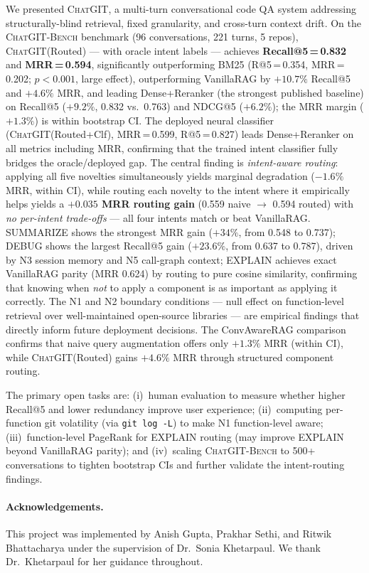 \documentclass[runningheads]{llncs}
\newcommand{\chatgit}{\textsc{ChatGIT}\xspace}
\newcommand{\conv}{\textsc{ChatGIT-Bench}\xspace}
\begin{document}
We presented \chatgit, a multi-turn conversational code QA system
addressing structurally-blind retrieval, fixed granularity, and
cross-turn context drift. On the \conv benchmark (96 conversations,
221 turns, 5 repos), \chatgit (Routed) --- with oracle intent
labels --- achieves \textbf{Recall@5\,=\,0.832} and
\textbf{MRR\,=\,0.594}, significantly outperforming BM25
(R@5\,=\,0.354, MRR\,=\,0.202; $p{<}0.001$, large effect),
outperforming VanillaRAG by $+10.7\%$ Recall@5 and $+4.6\%$ MRR,
and leading Dense+Reranker (the strongest published baseline) on
Recall@5 ($+9.2\%$, 0.832 vs.\ 0.763) and NDCG@5 ($+6.2\%$);
the MRR margin ($+1.3\%$) is within bootstrap CI.
The deployed neural classifier (\chatgit (Routed+Clf),
MRR\,=\,0.599, R@5\,=\,0.827) leads Dense+Reranker on all metrics
including MRR, confirming that the trained intent classifier fully
bridges the oracle/deployed gap.
The central finding is \emph{intent-aware routing}: applying all
five novelties simultaneously yields marginal degradation ($-1.6\%$
MRR, within CI), while routing each novelty to the intent where it
empirically helps yields a \textbf{$+0.035$ MRR routing gain}
(0.559 naive $\to$ 0.594 routed) with \emph{no per-intent
trade-offs} --- all four intents match or beat VanillaRAG.
SUMMARIZE shows the strongest MRR gain ($+34\%$, from 0.548 to
0.737); DEBUG shows the largest Recall@5 gain ($+23.6\%$, from
0.637 to 0.787), driven by N3 session memory and N5 call-graph
context; EXPLAIN achieves exact VanillaRAG parity (MRR 0.624)
by routing to pure cosine similarity, confirming that knowing
when \emph{not} to apply a component is as important as applying
it correctly. The N1 and N2 boundary conditions --- null effect on
function-level retrieval over well-maintained open-source libraries
--- are empirical findings that directly inform future deployment
decisions. The ConvAwareRAG comparison confirms that naive query
augmentation offers only $+1.3\%$ MRR (within CI), while
\chatgit (Routed) gains $+4.6\%$ MRR through structured
component routing.

The primary open tasks are: (i)~human evaluation to measure
whether higher Recall@5 and lower redundancy improve user
experience; (ii)~computing per-function git volatility
(via \texttt{git log -L}) to make N1 function-level aware;
(iii)~function-level PageRank for EXPLAIN routing (may improve
EXPLAIN beyond VanillaRAG parity); and
(iv)~scaling \conv to 500+ conversations to tighten bootstrap
CIs and further validate the intent-routing findings.

\paragraph{Acknowledgements.}
This project was implemented by Anish Gupta, Prakhar Sethi, and
Ritwik Bhattacharya under the supervision of Dr.~Sonia Khetarpaul.
We thank Dr.~Khetarpaul for her guidance throughout.
\end{document}
